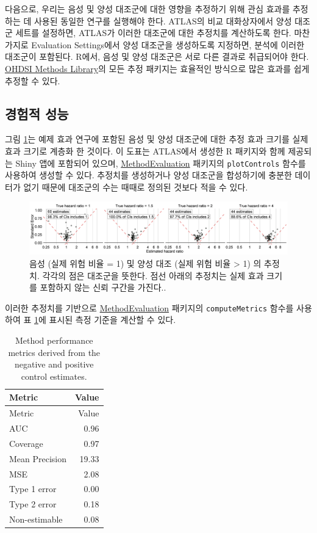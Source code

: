 \documentclass[10.5pt]{book}
\theoremstyle{definition}
\theoremstyle{definition}
\theoremstyle{definition}
\theoremstyle{remark}
\begin{document}
다음으로, 우리는 음성 및 양성 대조군에 대한 영향을 추정하기 위해 관심
효과를 추정하는 데 사용된 동일한 연구를 실행해야 한다. ATLAS의 비교
대화상자에서 양성 대조군 세트를 설정하면, ATLAS가 이러한 대조군에 대한
추정치를 계산하도록 한다. 마찬가지로 Evaluation Settings에서 양성
대조군을 생성하도록 지정하면, 분석에 이러한 대조군이 포함된다. R에서,
음성 및 양성 대조군은 서로 다른 결과로 취급되어야 한다.
\href{https://ohdsi.github.io/MethodsLibrary/}{OHDSI Methods Library}의
모든 추정 패키지는 효율적인 방식으로 많은 효과를 쉽게 추정할 수 있다.

\subsection{경험적 성능}\label{-}

그림 \ref{fig:controls}는 예제 효과 연구에 포함된 음성 및 양성 대조군에
대한 추정 효과 크기를 실제 효과 크기로 계층화 한 것이다. 이 도표는
ATLAS에서 생성한 R 패키지와 함께 제공되는 Shiny 앱에 포함되어 있으며,
\href{https://ohdsi.github.io/MethodEvaluation/}{MethodEvaluation}
패키지의 \texttt{plotControls} 함수를 사용하여 생성할 수 있다. 추정치를
생성하거나 양성 대조군을 합성하기에 충분한 데이터가 없기 때문에 대조군의
수는 때때로 정의된 것보다 적을 수 있다.

\begin{figure}

{\centering \includegraphics[width=1\linewidth]{images/MethodValidity/controls} 

}

\caption{음성 (실제 위험 비율 = 1) 및 양성 대조 (실제 위험 비율 > 1) 의 추정치. 각각의 점은 대조군을 뜻한다. 점선 아래의 추정치는 실제 효과 크기를 포함하지 않는 신뢰 구간을 가진다..}\label{fig:controls}
\end{figure}

이러한 추정치를 기반으로
\href{https://ohdsi.github.io/MethodEvaluation/}{MethodEvaluation}
패키지의 \texttt{computeMetrics} 함수를 사용하여 표
\ref{tab:exampleMetrics}에 표시된 측정 기준을 계산할 수 있다.

\begin{longtable}[]{@{}lr@{}}
\caption{\label{tab:exampleMetrics} Method performance metrics derived from
the negative and positive control estimates.}\tabularnewline
\toprule
Metric & Value\tabularnewline
\midrule
\endfirsthead
\toprule
Metric & Value\tabularnewline
\midrule
\endhead
AUC & 0.96\tabularnewline
Coverage & 0.97\tabularnewline
Mean Precision & 19.33\tabularnewline
MSE & 2.08\tabularnewline
Type 1 error & 0.00\tabularnewline
Type 2 error & 0.18\tabularnewline
Non-estimable & 0.08\tabularnewline
\bottomrule
\end{longtable}
\end{document}

